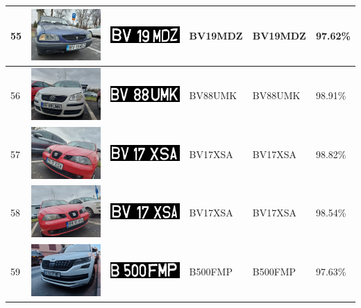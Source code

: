 \documentclass[a4paper,12pt]{report}
\begin{document}
\begin{longtable}{| m{0.6cm} | m{3cm} | m{3cm} | m{1.8cm} | m{1.8cm} | m{1.8cm} |}
        55 & \includegraphics[width=3cm,keepaspectratio]{dataset/30_s1.jpg} & \includegraphics[width=3cm,keepaspectratio]{segmentari/55.jpg} & BV19MDZ & BV19MDZ & 97.62\% \\ \hline
        56 & \includegraphics[width=3cm,keepaspectratio]{dataset/31_d1.jpg} & \includegraphics[width=3cm,keepaspectratio]{segmentari/56.jpg} & BV88UMK & BV88UMK & 98.91\% \\ \hline
        57 & \includegraphics[width=3cm,keepaspectratio]{dataset/32_d1.jpg} & \includegraphics[width=3cm,keepaspectratio]{segmentari/57.jpg} & BV17XSA & BV17XSA & 98.82\% \\ \hline
        58 & \includegraphics[width=3cm,keepaspectratio]{dataset/32_s1.jpg} & \includegraphics[width=3cm,keepaspectratio]{segmentari/58.jpg} & BV17XSA & BV17XSA & 98.54\% \\ \hline
        59 & \includegraphics[width=3cm,keepaspectratio]{dataset/33_d1.jpg} & \includegraphics[width=3cm,keepaspectratio]{segmentari/59.jpg} & B500FMP & B500FMP & 97.63\% \\ \hline

\end{longtable}
\end{document}
